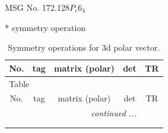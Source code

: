 \documentclass[fleqn,8pt]{jsarticle}
\begin{document}
\setcounter{MaxMatrixCols}{32}

\renewcommand{\tablename}{Table~}
\renewcommand{\figurename}{Figure~}
\begin{center}
\LARGE
MSG No. 172.128\quad$P_{c}6_{4}$
\end{center}
* symmetry operation
\renewcommand{\arraystretch}{1.3}
\begin{longtable}{ccccc}
\caption{Symmetry operations for 3d polar vector.}
 \\
 \hline \hline
No. & tag & matrix (polar) & det & TR \\ \hline \endfirsthead

\multicolumn{4}{l}{\tablename\ \thetable{}} \\
 \hline \hline
No. & tag & matrix (polar) & det & TR \\ \hline \endhead

 \hline \hline
\multicolumn{4}{r}{\footnotesize\it continued ...} \\ \endfoot

 \hline \hline
\multicolumn{4}{r}{} \\ \endlastfoot


\end{longtable}
\end{document}
